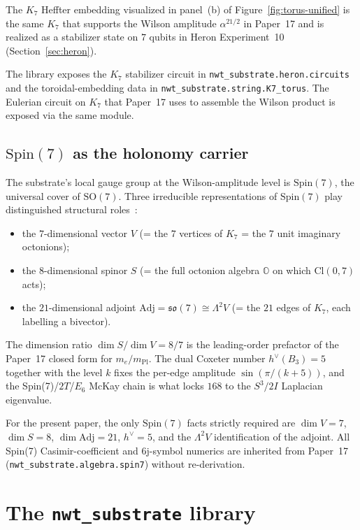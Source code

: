 \documentclass[11pt]{article}
\newcommand{\so}{\mathfrak{so}}
\newcommand{\Spin}{\mathrm{Spin}}
\newcommand{\Adj}{\mathrm{Adj}}
\newcommand{\mPl}{m_{\mathrm{Pl}}}
\newcommand{\me}{m_e}
\newcommand{\hv}{h^{\vee}}
\newcommand{\SO}{\mathrm{SO}}
\newcommand{\nwtsub}{\texttt{nwt\_substrate}}
\begin{document}
The $K_7$ Heffter embedding visualized in
panel~(b) of Figure~\ref{fig:torus-unified} is the same $K_7$ that
supports the Wilson amplitude $\alpha^{21/2}$ in Paper~17 and is
realized as a stabilizer state on $7$ qubits in Heron
Experiment~10 (Section~\ref{sec:heron}).

The library exposes the $K_7$ stabilizer circuit in
\texttt{nwt\_substrate.heron.circuits} and the toroidal-embedding
data in \texttt{nwt\_substrate.string.K7\_torus}.  The Eulerian
circuit on $K_7$ that Paper~17 uses to assemble the Wilson product
is exposed via the same module.

\subsection{$\Spin(7)$ as the holonomy carrier}

The substrate's local gauge group at the Wilson-amplitude level
is $\Spin(7)$, the universal cover of $\SO(7)$.  Three irreducible
representations of $\Spin(7)$ play distinguished structural
roles~\cite{adams1996}:
\begin{itemize}
\item the $7$-dimensional vector $V$ (= the $7$ vertices of $K_7$
      = the $7$ unit imaginary octonions);
\item the $8$-dimensional spinor $S$ (= the full octonion algebra
      $\mathbb{O}$ on which $\mathrm{Cl}(0,7)$ acts);
\item the $21$-dimensional adjoint
      $\Adj = \so(7) \cong \Lambda^2 V$
      (= the $21$ edges of $K_7$, each labelling a bivector).
\end{itemize}
The dimension ratio $\dim S / \dim V = 8/7$ is the leading-order
prefactor of the Paper~17 closed form for $\me/\mPl$.  The dual
Coxeter number $\hv(B_3) = 5$ together with the level $k$ fixes
the per-edge amplitude $\sin(\pi/(k+5))$, and the
Spin(7)/$2T$/$E_6$ McKay chain is what locks $168$ to the
$S^3/2I$ Laplacian eigenvalue.

For the present paper, the only $\Spin(7)$ facts strictly required
are $\dim V = 7$, $\dim S = 8$, $\dim \Adj = 21$, $\hv = 5$, and
the $\Lambda^2 V$ identification of the adjoint.  All Spin(7)
Casimir-coefficient and 6j-symbol numerics are inherited from
Paper~17 (\texttt{nwt\_substrate.algebra.spin7}) without
re-derivation.

\section{The \nwtsub{} library}
\label{sec:library}
\end{document}
